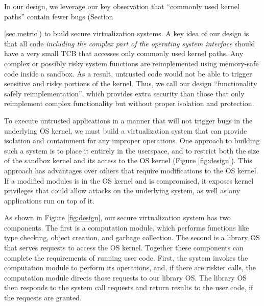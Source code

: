 In our design, we leverage our key observation
 that ``commonly used kernel paths'' contain fewer bugs
(Section {\ref{sec.metric}) to build secure virtualization systems.
A key idea of our design is that all code \emph{including the complex part
of the operating system interface} should have a very small TCB that accesses only
commonly used kernel paths.
Any complex or possibly risky system functions
are reimplemented using memory-safe code inside a sandbox. 
As a result, untrusted code would not be able to
trigger sensitive and risky portions of the kernel. 
Thus, we call our design ``functionality safely reimplementation'', 
which provides extra security than those that only reimplement 
complex functionality but without proper isolation and protection. 

To execute untrusted applications in a manner that will not trigger bugs
in the underlying OS kernel, %
we must build a virtualization system that can provide isolation and
containment for any improper operations.
One approach to building such a system is to place it entirely in the userspace,
and to restrict both the size of the sandbox kernel and its access to the
OS kernel (Figure \ref{fig:design}).
This approach has advantages over others that require modifications to
the OS kernel. 
If a modified modules is in the OS kernel and is compromised, it exposes 
kernel privileges that could allow attacks
on the underlying system, as well as any applications run on top of it.

As shown in Figure \ref{fig:design}, our secure virtualization system
has two components.
The first is a computation module, which performs functions like type checking,
object creation, and garbage collection. 
The second is a library OS that
serves requests to access the OS kernel.
Together these components can complete the requirements of running user code.
First, the system invokes the computation module to perform its operations,
and, if there are riskier calls, the computation module directs those requests to our
library OS. The library OS then responds to the system call requests and
return results to the user code, if the requests are granted.


}
